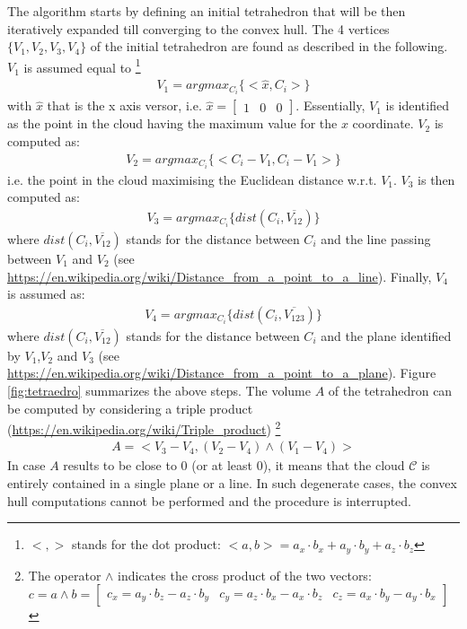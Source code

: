 \documentclass{article}
\begin{document}
The algorithm starts by defining an initial tetrahedron that will be then iteratively expanded till converging to the convex hull.
The 4 vertices $ \lbrace V_1,V_2,V_3,V_4  \rbrace$ of the initial tetrahedron are found as described in the following.
\\
$V_1$ is assumed equal to \footnote{$<,>$ stands for the dot product: $<a,b>= a_x \cdot b_x + a_y \cdot b_y + a_z \cdot b_z $}
\begin{eqnarray}
V_1 = argmax_{C_i} \lbrace <\hat{x} , C_i>\rbrace
\end{eqnarray}
with $\hat{x}$ that is the x axis versor, i.e. $\hat{x} = \begin{bmatrix} 1 & 0 & 0 \end{bmatrix}$. Essentially, $V_1$ is identified as the point in the cloud having the maximum value for the $x$ coordinate.
$V_2$ is computed as:
\begin{eqnarray}
V_2 = argmax_{C_i} \lbrace <C_i - V_1,  C_i - V_1> \rbrace
\end{eqnarray}
i.e. the point in the cloud maximising the Euclidean distance w.r.t. $V_1$.
$V_3$ is then computed as:
\begin{eqnarray}
V_3 = argmax_{C_i} \lbrace dist(C_i, \overline{V_{12}}) \rbrace
\end{eqnarray}
where $dist(C_i, \overline{V_{12}})$ stands for the distance between $C_i$ and the line passing between $V_1$ and $V_2$ (see \url{https://en.wikipedia.org/wiki/Distance_from_a_point_to_a_line}). 
Finally, $V_4$ is assumed as:
\begin{eqnarray}
V_4 = argmax_{C_i} \lbrace dist(C_i, \overline{V_{123}})  \rbrace
\end{eqnarray}
where $dist(C_i, \overline{V_{12}})$ stands for the distance between $C_i$ and the plane identified by $V_1$,$V_2$ and $V_3$ (see \url{https://en.wikipedia.org/wiki/Distance_from_a_point_to_a_plane}). 
Figure \ref{fig:tetraedro} summarizes the above steps.
The volume $A$ of the tetrahedron can be computed by considering a triple product (\url{https://en.wikipedia.org/wiki/Triple_product}) \footnote{The operator $\wedge$ indicates the cross product of the two vectors: $c = a \wedge b = \begin{bmatrix} c_x = a_y \cdot b_z - a_z \cdot b_y  & c_y = a_z \cdot b_x - a_x \cdot b_z & c_z = a_x \cdot b_y - a_y \cdot b_x \end{bmatrix}$}
\begin{eqnarray}
A = <V_3 - V_4 ,  (V_2 - V_4) \wedge (V_1 - V_4) >
\end{eqnarray}
In case $A$ results to be close to 0 (or at least 0), it means that the cloud $\mathcal{C}$ is entirely contained in a single plane or a line. In such degenerate cases, the convex hull computations cannot be performed and the procedure is interrupted.
\end{document}
